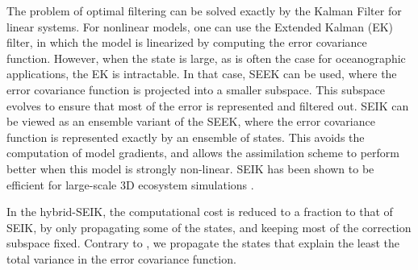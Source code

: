 The problem of optimal filtering can be solved exactly by the Kalman Filter for
linear systems. For nonlinear models, one can use the Extended Kalman (EK)
filter, in which the model is linearized by computing the error covariance
function.  However, when the state is large, as is often the case for
oceanographic applications, the EK is intractable. In that case, SEEK can be
used, where the error covariance function is projected into a smaller subspace.
This subspace evolves to ensure that most of the error is represented and
filtered out. SEIK can be viewed as an ensemble variant of the SEEK, where the
error covariance function is represented exactly by an ensemble of states. This
avoids the computation of model gradients, and allows the assimilation scheme
to perform better when this model is strongly non-linear. SEIK has been shown
to be efficient for large-scale 3D ecosystem simulations
\citep{Triantfyllou2003}.

In the hybrid-SEIK, the computational cost is reduced to a fraction to that of
SEIK, by only propagating some of the states, and keeping most of the
correction subspace fixed. Contrary to \citet{Hoteit2002}, we propagate the
states that explain the least the total variance in the error covariance
function.
